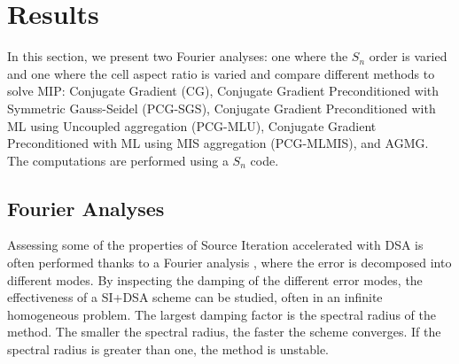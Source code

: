 \section{Results} \label{sec_res}

In this section, we present two Fourier analyses: one where the $S_n$ order is
varied and one where the cell aspect ratio is varied and compare different
methods to solve MIP: Conjugate Gradient (CG), Conjugate Gradient
Preconditioned with Symmetric Gauss-Seidel (PCG-SGS), Conjugate Gradient
Preconditioned with ML using Uncoupled aggregation (PCG-MLU),
Conjugate Gradient Preconditioned with ML using MIS aggregation (PCG-MLMIS),
and AGMG. The computations are performed using a $S_n$ code.

\subsection{Fourier Analyses}

Assessing some of the properties of Source Iteration accelerated with DSA is
often performed thanks to a Fourier analysis \cite{larsen_dsa,consistent_p1},
where the error is decomposed into different modes. By inspecting the 
damping of the different error modes, the effectiveness of a SI+DSA scheme can 
be studied, often in an infinite homogeneous problem. The largest damping
factor is the spectral radius of the method. The smaller the spectral radius,
the faster the scheme converges. If the spectral
radius is greater than one, the method is unstable. 
